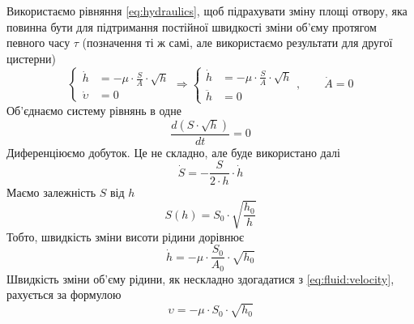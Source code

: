Використаємо рівняння \eqref{eq:hydraulics}, щоб підрахувати зміну площі отвору,
яка повинна бути для підтримання постійної швидкості зміни об’єму протягом
певного часу $\tau$ (позначення ті ж самі, але використаємо результати для
другої цистерни)
\begin{equation}\label{eq:hydrodynamics:varSquare}
  \begin{cases}
    \dot{h}         &= - \mu \cdot \frac{S}{A} \cdot \sqrt{h} \\
    \dot{\upsilon}  &= 0
  \end{cases} \Rightarrow
  \begin{cases}
    \dot{h}  &= - \mu \cdot \frac{S}{A} \cdot \sqrt{h} \\
    \ddot{h} &= 0
  \end{cases},
  \qquad \dot{A} = 0
\end{equation}
Об’єднаємо систему рівнянь в одне
\begin{equation*}
  \frac{d\left( S \cdot \sqrt{h} \right)}{dt}
  = 0
\end{equation*}
Диференціюємо добуток. Це не складно, але буде використано далі
\begin{equation}\label{eq:hydrodynamics:valuableResult}
  \dot{S}
  = - \frac{S}{2 \cdot h}
    \cdot \dot{h}
\end{equation}
Маємо залежність $S$ від $h$
\begin{equation}\label{eq:hydrodynamics:varSolutionSh}
  S\left( h \right) = S_0 \cdot \sqrt{\frac{h_0}{h}}
\end{equation}
Тобто, швидкість зміни висоти рідини дорівнює
\begin{equation*}
  \dot{h} = - \mu \cdot \frac{S_0}{A_0} \cdot \sqrt{h_0}
\end{equation*}
Швидкість зміни об’єму рідини, як нескладно здогадатися з
\eqref{eq:fluid:velocity}, рахується за формулою
\begin{equation*}
  \upsilon
  = - \mu \cdot S_0 \cdot \sqrt{h_0}
\end{equation*}

